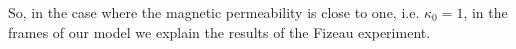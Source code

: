 \documentclass{article}
\theoremstyle{definition}
\theoremstyle{remark}
\begin{document}
So, in the case where the magnetic permeability is close to one,
i.e. $\kappa_0=1$, in the frames of our model we explain the results
of the Fizeau experiment.
\end{document}
